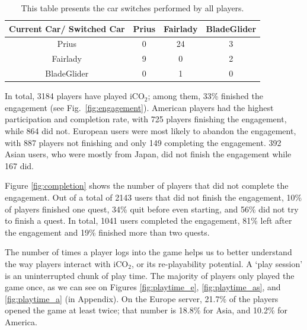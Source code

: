 \documentclass[preprint,authoryear,12pt]{elsarticle}
\begin{document}
\begin{table}[!htb]
	\renewcommand*{\arraystretch}{1.4}
	\caption{This table presents the car switches performed by all players.}
	\begin{center}
		\begin{tabular}{c|c|c|c}
			Current Car/ Switched Car & Prius & Fairlady & BladeGlider \\
			\hline
			Prius &	 0
			& 24  & 3  \\
			
			Fairlady & 9
			& 0  &  2 \\
			
			BladeGlider &	 0
			& 1  &  0  \\
			
		\end{tabular}
	\end{center}
	\label{T:Carswitch_all}
\end{table}


In total, 3184 players have played iCO$_2$; among them, 33\% finished the engagement (see Fig.~\ref{fig:engagement}). American players had the highest participation and completion rate, with 725 players finishing the engagement, while 864 did not. European users were most likely to abandon the engagement, with 887 players not finishing and only 149 completing the engagement. 392 Asian users, who were mostly from Japan, did not finish the engagement while 167 did.

Figure \ref{fig:completion} shows the number of players that did not complete the engagement. Out of a total of 2143 users that did not finish the engagement, 10\% of players finished one quest, 34\% quit before even starting, and 56\% did not try to finish a quest. In total, 1041 users completed the engagement, 81\% left after the engagement and 19\% finished more than two quests.


The number of times a player logs into the game helps us to better understand the way players interact with iCO$_2$, or its re-playability potential. A `play session' is an uninterrupted chunk of play time. The majority of players only played the game once, as we can see on Figures \ref{fig:playtime_e}, \ref{fig:playtime_as}, and \ref{fig:playtime_a} (in Appendix).
On the Europe server, 21.7\% of the players opened the game at least twice; that number is 18.8\% for Asia, and 10.2\% for America.
\end{document}
